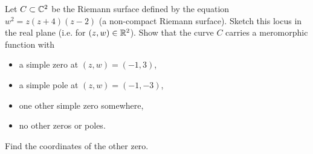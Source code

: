 \documentclass[expanded]{lkx_pset}
\begin{document}
\begin{problem}{5}
Let $C\subset \mathbb{C}^{2}$ be the Riemann surface defined by the
equation $w^{2}=z(z+4)(z-2)$ (a non-compact Riemann surface).
Sketch this locus in the real plane (i.e. for $(z,w) \in \mathbb{R}^{2}$).
Show that the curve $C$ carries a meromorphic function with
\begin{itemize}
	\item a simple zero at $(z,w)=(-1,3)$,
	\item a simple pole at
	      $(z,w)=(-1,-3)$,
	\item one other simple zero somewhere,
	\item no other zeros or poles.
\end{itemize}
Find the coordinates of the other zero.

\end{problem}

\begin{solution}
\end{solution}
\end{document}
